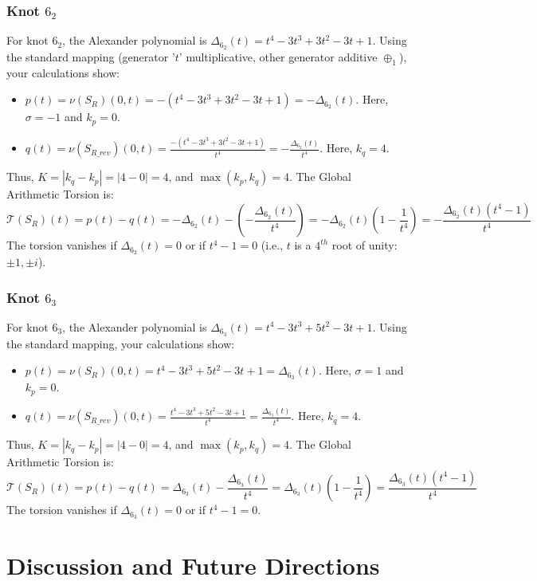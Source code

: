\documentclass{article}[a4paper,12pt]
\begin{document}
\subsubsection{Knot $6_2$}
For knot $6_2$, the Alexander polynomial is $\Delta_{6_2}(t) = t^4 - 3t^3 + 3t^2 - 3t + 1$.
Using the standard mapping (generator '$t$' multiplicative, other generator additive $\oplus_1$), your calculations show:
\begin{itemize}
    \item $p(t) = \nu(S_R)(0,t) = -(t^4 - 3t^3 + 3t^2 - 3t + 1) = -\Delta_{6_2}(t)$.
    Here, $\sigma = -1$ and $k_p=0$.
    \item $q(t) = \nu(S_{R\_rev})(0,t) = \frac{-(t^4 - 3t^3 + 3t^2 - 3t + 1)}{t^4} = -\frac{\Delta_{6_2}(t)}{t^4}$.
    Here, $k_q=4$.
\end{itemize}
Thus, $K = |k_q-k_p| = |4-0| = 4$, and $\max(k_p,k_q)=4$.
The Global Arithmetic Torsion is:
\[ \mathcal{T}(S_R)(t) = p(t) - q(t) = -\Delta_{6_2}(t) - \left(-\frac{\Delta_{6_2}(t)}{t^4}\right) = -\Delta_{6_2}(t)\left(1 - \frac{1}{t^4}\right) = -\frac{\Delta_{6_2}(t)(t^4-1)}{t^4} \]
The torsion vanishes if $\Delta_{6_2}(t)=0$ or if $t^4-1=0$ (i.e., $t$ is a $4^{th}$ root of unity: $\pm 1, \pm i$).

\subsubsection{Knot $6_3$}
For knot $6_3$, the Alexander polynomial is $\Delta_{6_3}(t) = t^4 - 3t^3 + 5t^2 - 3t + 1$.
Using the standard mapping, your calculations show:
\begin{itemize}
    \item $p(t) = \nu(S_R)(0,t) = t^4 - 3t^3 + 5t^2 - 3t + 1 = \Delta_{6_3}(t)$.
    Here, $\sigma = 1$ and $k_p=0$.
    \item $q(t) = \nu(S_{R\_rev})(0,t) = \frac{t^4 - 3t^3 + 5t^2 - 3t + 1}{t^4} = \frac{\Delta_{6_3}(t)}{t^4}$.
    Here, $k_q=4$.
\end{itemize}
Thus, $K = |k_q-k_p| = |4-0| = 4$, and $\max(k_p,k_q)=4$.
The Global Arithmetic Torsion is:
\[ \mathcal{T}(S_R)(t) = p(t) - q(t) = \Delta_{6_3}(t) - \frac{\Delta_{6_3}(t)}{t^4} = \Delta_{6_3}(t)\left(1 - \frac{1}{t^4}\right) = \frac{\Delta_{6_3}(t)(t^4-1)}{t^4} \]
The torsion vanishes if $\Delta_{6_3}(t)=0$ or if $t^4-1=0$.

\section{Discussion and Future Directions}
\end{document}
